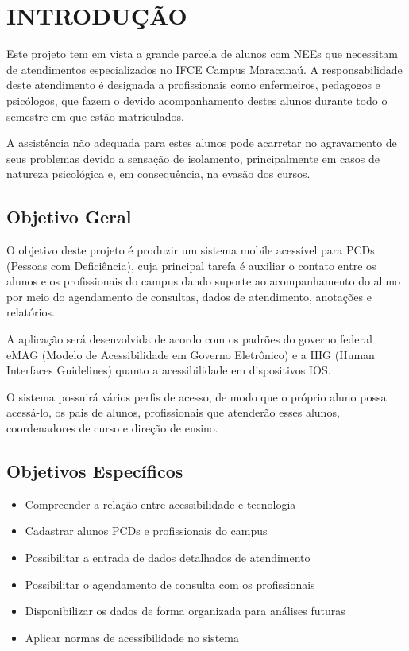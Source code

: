 
\chapter{INTRODUÇÃO}
\label{chap:introducao}
Este projeto tem em vista a grande parcela de alunos com NEEs que necessitam de atendimentos especializados no IFCE Campus Maracanaú. A responsabilidade deste atendimento é designada a profissionais como enfermeiros, pedagogos e psicólogos, que fazem o devido acompanhamento destes alunos durante todo o semestre em que estão matriculados.

A assistência não adequada para estes alunos pode acarretar no agravamento de seus problemas devido a sensação de isolamento, principalmente em casos de natureza psicológica e, em consequência, na evasão dos cursos.

\section{Objetivo Geral}
\label{sec:objGeral}
O objetivo deste projeto é produzir um sistema mobile acessível para PCDs (Pessoas com Deficiência), cuja principal tarefa é auxiliar o contato entre os alunos e os profissionais do campus dando suporte ao acompanhamento do aluno por meio do agendamento de consultas, dados de atendimento, anotações e relatórios.

A aplicação será desenvolvida de acordo com os padrões do governo federal eMAG (Modelo de Acessibilidade em Governo Eletrônico) e a HIG (Human Interfaces Guidelines) quanto a acessibilidade em dispositivos IOS.

O sistema possuirá vários perfis de acesso, de modo que o próprio aluno possa acessá-lo, os pais de alunos, profissionais que atenderão esses alunos, coordenadores de curso e direção de ensino. 

\section{Objetivos Específicos}
\label{sec:objEspecíficos}

\begin{itemize}
    \item Compreender a relação entre acessibilidade e tecnologia
    \item Cadastrar alunos PCDs e profissionais do campus
    \item Possibilitar a entrada de dados detalhados de atendimento
    \item Possibilitar o agendamento de consulta com os profissionais
    \item Disponibilizar os dados de forma organizada para análises futuras
    \item Aplicar normas de acessibilidade no sistema
\end{itemize}

